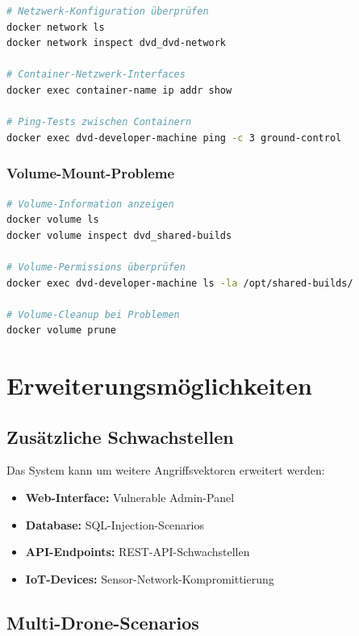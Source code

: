 \documentclass[11pt,a4paper]{article}
\begin{document}
\begin{lstlisting}[language=bash, caption=Netzwerk-Debugging]
# Netzwerk-Konfiguration überprüfen
docker network ls
docker network inspect dvd_dvd-network

# Container-Netzwerk-Interfaces
docker exec container-name ip addr show

# Ping-Tests zwischen Containern
docker exec dvd-developer-machine ping -c 3 ground-control
\end{lstlisting}

\subsubsection{Volume-Mount-Probleme}

\begin{lstlisting}[language=bash, caption=Volume-Debugging]
# Volume-Information anzeigen
docker volume ls
docker volume inspect dvd_shared-builds

# Volume-Permissions überprüfen
docker exec dvd-developer-machine ls -la /opt/shared-builds/

# Volume-Cleanup bei Problemen
docker volume prune
\end{lstlisting}

\section{Erweiterungsmöglichkeiten}

\subsection{Zusätzliche Schwachstellen}

Das System kann um weitere Angriffsvektoren erweitert werden:

\begin{itemize}
    \item \textbf{Web-Interface:} Vulnerable Admin-Panel
    \item \textbf{Database:} SQL-Injection-Scenarios
    \item \textbf{API-Endpoints:} REST-API-Schwachstellen
    \item \textbf{IoT-Devices:} Sensor-Network-Kompromittierung
\end{itemize}

\subsection{Multi-Drone-Scenarios}
\end{document}
